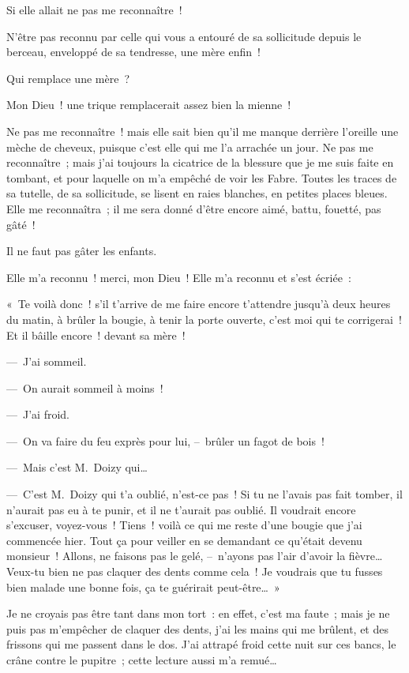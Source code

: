 \documentclass[french,twoside]{book} %
\begin{document}
Si elle allait ne pas me reconnaître !\par
N’être pas reconnu par celle qui vous a entouré de sa sollicitude depuis le berceau, enveloppé de sa tendresse, une mère enfin !\par
Qui remplace une mère ?\par
Mon Dieu ! une trique remplacerait assez bien la mienne !\par
Ne pas me reconnaître ! mais elle sait bien qu’il me manque derrière l’oreille une mèche de cheveux, puisque c’est elle qui me l’a arrachée un jour. Ne pas me reconnaître ; mais j’ai toujours la cicatrice de la blessure que je me suis faite en tombant, et pour laquelle on m’a empêché de voir les Fabre. Toutes les traces de sa tutelle, de sa sollicitude, se lisent en raies blanches, en petites places bleues. Elle me reconnaîtra ; il me sera donné d’être encore aimé, battu, fouetté, pas gâté !\par
Il ne faut pas gâter les enfants.\par
\bigbreak
\noindent Elle m’a reconnu ! merci, mon Dieu ! Elle m’a reconnu et s’est écriée :\par
« Te voilà donc ! s’il t’arrive de me faire encore t’attendre jusqu’à deux heures du matin, à brûler la bougie, à tenir la porte ouverte, c’est moi qui te corrigerai ! Et il bâille encore ! devant sa mère !\par
— J’ai sommeil.\par
— On aurait sommeil à moins !\par
— J’ai froid.\par
— On va faire du feu exprès pour lui, – brûler un fagot de bois !\par
— Mais c’est M. Doizy qui…\par
— C’est M. Doizy qui t’a oublié, n’est-ce pas ! Si tu ne l’avais pas fait tomber, il n’aurait pas eu à te punir, et il ne t’aurait pas oublié. Il voudrait encore s’excuser, voyez-vous ! Tiens ! voilà ce qui me reste d’une bougie que j’ai commencée hier. Tout ça pour veiller en se demandant ce qu’était devenu monsieur ! Allons, ne faisons pas le gelé, – n’ayons pas l’air d’avoir la fièvre… Veux-tu bien ne pas claquer des dents comme cela ! Je voudrais que tu fusses bien malade une bonne fois, ça te guérirait peut-être… »\par
\bigbreak
\noindent Je ne croyais pas être tant dans mon tort : en effet, c’est ma faute ; mais je ne puis pas m’empêcher de claquer des dents, j’ai les mains qui me brûlent, et des frissons qui me passent dans le dos. J’ai attrapé froid cette nuit sur ces bancs, le crâne contre le pupitre ; cette lecture aussi m’a remué…\par
\end{document}
